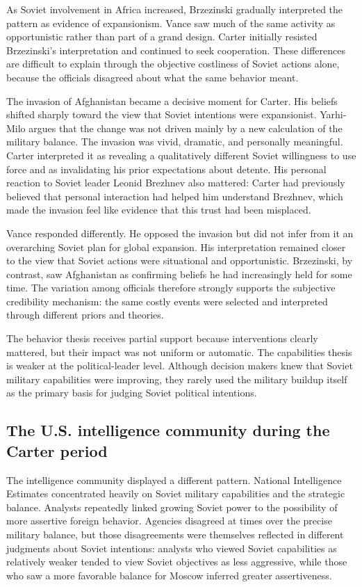 As Soviet involvement in Africa increased, Brzezinski gradually interpreted the pattern as evidence of expansionism. Vance saw much of the same activity as opportunistic rather than part of a grand design. Carter initially resisted Brzezinski's interpretation and continued to seek cooperation. These differences are difficult to explain through the objective costliness of Soviet actions alone, because the officials disagreed about what the same behavior meant.

The invasion of Afghanistan became a decisive moment for Carter. His beliefs shifted sharply toward the view that Soviet intentions were expansionist. Yarhi-Milo argues that the change was not driven mainly by a new calculation of the military balance. The invasion was vivid, dramatic, and personally meaningful. Carter interpreted it as revealing a qualitatively different Soviet willingness to use force and as invalidating his prior expectations about detente. His personal reaction to Soviet leader Leonid Brezhnev also mattered: Carter had previously believed that personal interaction had helped him understand Brezhnev, which made the invasion feel like evidence that this trust had been misplaced.

Vance responded differently. He opposed the invasion but did not infer from it an overarching Soviet plan for global expansion. His interpretation remained closer to the view that Soviet actions were situational and opportunistic. Brzezinski, by contrast, saw Afghanistan as confirming beliefs he had increasingly held for some time. The variation among officials therefore strongly supports the subjective credibility mechanism: the same costly events were selected and interpreted through different priors and theories.

The behavior thesis receives partial support because interventions clearly mattered, but their impact was not uniform or automatic. The capabilities thesis is weaker at the political-leader level. Although decision makers knew that Soviet military capabilities were improving, they rarely used the military buildup itself as the primary basis for judging Soviet political intentions.

\subsection{The U.S. intelligence community during the Carter period}

The intelligence community displayed a different pattern. National Intelligence Estimates concentrated heavily on Soviet military capabilities and the strategic balance. Analysts repeatedly linked growing Soviet power to the possibility of more assertive foreign behavior. Agencies disagreed at times over the precise military balance, but those disagreements were themselves reflected in different judgments about Soviet intentions: analysts who viewed Soviet capabilities as relatively weaker tended to view Soviet objectives as less aggressive, while those who saw a more favorable balance for Moscow inferred greater assertiveness.

